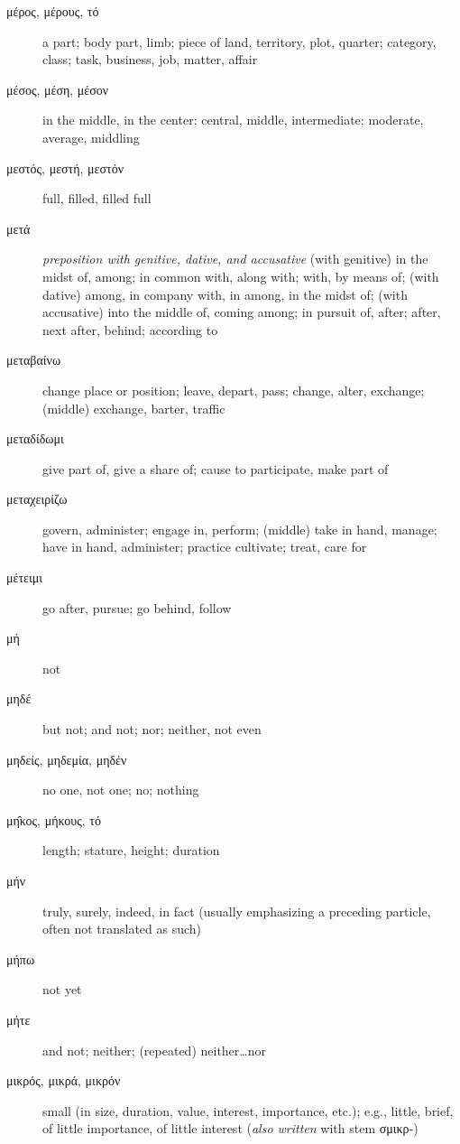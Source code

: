\documentclass[12pt,letterpaper]{article}
\begin{document}
\begin{description}
    \item[\textgreek{μέρος, μέρους, τό}] \marginnote{*}a part; body part, limb; piece of land, territory, plot, quarter; category, class; task, business, job, matter, affair
    \item[\textgreek{μέσος, μέση, μέσον}] \marginnote{*}in the middle, in the center; central, middle, intermediate; moderate, average, middling
    \item[\textgreek{μεστός, μεστή, μεστόν}] full, filled, filled full
    \item[\textgreek{μετά}] \marginnote{*}\textit{preposition with genitive, dative, and accusative} (with genitive) in the midst of, among; in common with, along with; with, by means of; (with dative) among, in company with, in among, in the midst of; (with accusative) into the middle of, coming among; in pursuit of, after; after, next after, behind; according to
    \item[\textgreek{μεταβαίνω}] change place or position; leave, depart, pass; change, alter, exchange; (middle) exchange, barter, traffic
    \item[\textgreek{μεταδίδωμι}] give part of, give a share of; cause to participate, make part of
    \item[\textgreek{μεταχειρίζω}] govern, administer; engage in, perform; (middle) take in hand, manage; have in hand, administer; practice cultivate; treat, care for
    \item[\textgreek{μέτειμι}] go after, pursue; go behind, follow
    \item[\textgreek{μή}] \marginnote{*}not
    \item[\textgreek{μηδέ}] \marginnote{*}but not; and not; nor; neither, not even
    \item[\textgreek{μηδείς, μηδεμία, μηδέν}] \marginnote{*}no one, not one; no; nothing
    \item[\textgreek{μη̂κος, μήκους, τό}] length; stature, height; duration
    \item[\textgreek{μήν}] \marginnote{*}truly, surely, indeed, in fact (usually emphasizing a preceding particle, often not translated as such)
    \item[\textgreek{μήπω}] not yet
    \item[\textgreek{μήτε}] \marginnote{*}and not; neither; (repeated) neither\dots nor
    \item[\textgreek{μικρός, μικρά, μικρόν}] \marginnote{*} small (in size, duration, value, interest, importance, etc.); e.g., little, brief, of little importance, of little interest (\textit{also written} with stem \textgreek{σμικρ}-)

\end{description}
\end{document}
